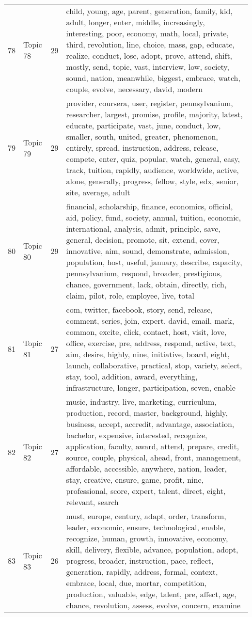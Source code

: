 \begin{table}[ht]
{\begin{tabularx}{\textwidth}{llrX}
   78 & Topic 78 & 29 & child, young, age, parent, generation, family, kid, adult, longer, enter, middle, increasingly, interesting, poor, economy, math, local, private, third, revolution, line, choice, mass, gap, educate, realize, conduct, lose, adopt, prove, attend, shift, mostly, send, topic, vast, interview, low, society, sound, nation, meanwhile, biggest, embrace, watch, couple, evolve, necessary, david, modern \\ 
   79 & Topic 79 & 29 & provider, coursera, user, register, pennsylvanium, researcher, largest, promise, profile, majority, latest, educate, participate, vast, june, conduct, low, smaller, south, united, greater, phenomenon, entirely, spread, instruction, address, release, compete, enter, quiz, popular, watch, general, easy, track, tuition, rapidly, audience, worldwide, active, alone, generally, progress, fellow, style, edx, senior, site, average, adult \\ 
   80 & Topic 80 & 29 & financial, scholarship, finance, economics, official, aid, policy, fund, society, annual, tuition, economic, international, analysis, admit, principle, save, general, decision, promote, sit, extend, cover, innovative, aim, sound, demonstrate, admission, population, host, useful, january, describe, capacity, pennsylvanium, respond, broader, prestigious, chance, government, lack, obtain, directly, rich, claim, pilot, role, employee, live, total \\ 
   81 & Topic 81 & 27 & com, twitter, facebook, story, send, release, comment, series, join, expert, david, email, mark, common, excite, click, contact, host, visit, love, office, exercise, pre, address, respond, active, text, aim, desire, highly, nine, initiative, board, eight, launch, collaborative, practical, stop, variety, select, stay, tool, addition, award, everything, infrastructure, longer, participation, seven, enable \\ 
   82 & Topic 82 & 27 & music, industry, live, marketing, curriculum, production, record, master, background, highly, business, accept, accredit, advantage, association, bachelor, expensive, interested, recognize, application, faculty, award, attend, prepare, credit, source, couple, physical, ahead, front, management, affordable, accessible, anywhere, nation, leader, stay, creative, ensure, game, profit, nine, professional, score, expert, talent, direct, eight, relevant, search \\ 
   83 & Topic 83 & 26 & must, europe, century, adapt, order, transform, leader, economic, ensure, technological, enable, recognize, human, growth, innovative, economy, skill, delivery, flexible, advance, population, adopt, progress, broader, instruction, pace, reflect, generation, rapidly, address, formal, context, embrace, local, due, mortar, competition, production, valuable, edge, talent, pre, affect, age, chance, revolution, assess, evolve, concern, examine \\ 

\end{tabularx}}
\end{table}
